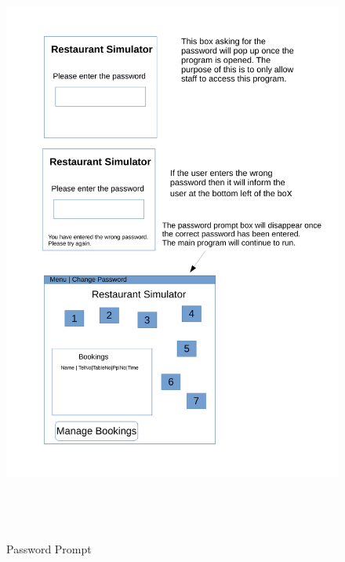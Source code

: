 \begin{figure}[H]
    \includegraphics[height = 20cm]{./Design/Images/Interface1}
    \caption{Password Prompt} \label{fig:Password}
\end{figure}

